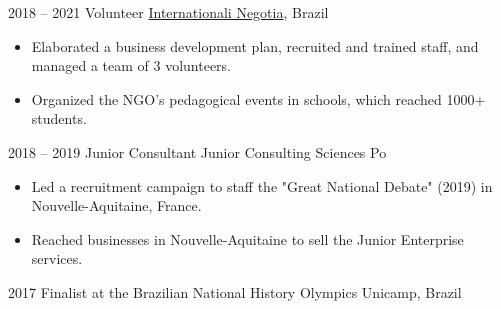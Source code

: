 \documentclass[9pt]{developercv} %
\begin{document}
\begin{entrylist}
\entry
		{2018 -- 2021}
		{Volunteer}
		{\href{https://www.internationali.org/sobre}{Internationali Negotia}, Brazil}
		{\vspace{-10pt}
        \begin{itemize}[noitemsep,topsep=0pt,parsep=0pt,partopsep=0pt, leftmargin=-1pt]
           \item Elaborated a business development plan, recruited and trained staff, and managed a team of 3 volunteers. 
           \item Organized the NGO's pedagogical events in schools, which reached 1000+ students.
        \end{itemize} 
        }
\entry
		{2018 -- 2019}
		{Junior Consultant}
		{Junior Consulting Sciences Po}
		{\vspace{-10pt}
        \begin{itemize}[noitemsep,topsep=0pt,parsep=0pt,partopsep=0pt, leftmargin=-1pt]
            \item Led a recruitment campaign to staff the "Great National Debate" (2019) in Nouvelle-Aquitaine, France. 
            \item Reached businesses in Nouvelle-Aquitaine to sell the Junior Enterprise services. 
        \end{itemize} 
        }
\entry
		{2017}
		{Finalist at the Brazilian National History Olympics}
		{Unicamp, Brazil}
            {}
\end{entrylist}
\let\clearpage\relax
\end{document}
